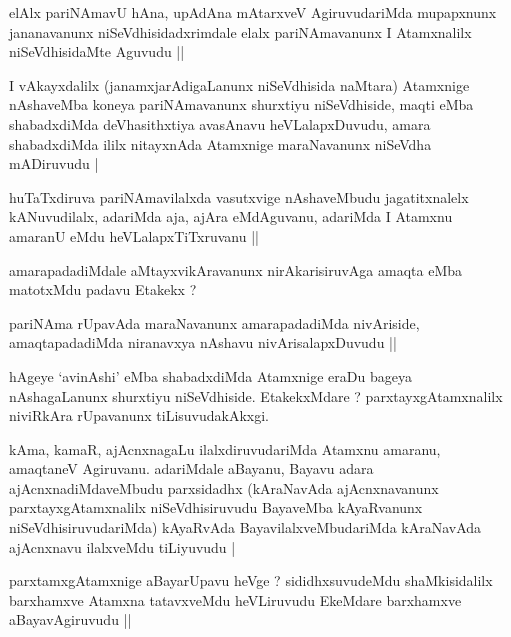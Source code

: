\begin{artha}
elAlx pariNAmavU hAna, upAdAna mAtarxveV AgiruvudariMda mupapxnunx jananavanunx niSeVdhisidadxrimdale elalx pariNAmavanunx I Atamxnalilx niSeVdhisidaMte Aguvudu ||
\end{artha}


\begin{artha}
I vAkayxdalilx (janamxjarAdigaLanunx niSeVdhisida naMtara) Atamxnige nAshaveMba koneya pariNAmavanunx shurxtiyu niSeVdhiside, maqti eMba shabadxdiMda deVhasithxtiya avasAnavu heVLalapxDuvudu, amara shabadxdiMda ililx nitayxnAda Atamxnige maraNavanunx niSeVdha mADiruvudu |
\end{artha}

\begin{artha}
huTaTxdiruva pariNAmavilalxda vasutxvige nAshaveMbudu jagatitxnalelx kANuvudilalx, adariMda aja, ajAra eMdAguvanu, adariMda I Atamxnu amaranU eMdu heVLalapxTiTxruvanu ||
\end{artha}

\begin{artha}
amarapadadiMdale aMtayxvikAravanunx nirAkarisiruvAga amaqta eMba matotxMdu padavu Etakekx ?
\end{artha}

\begin{artha}
pariNAma rUpavAda maraNavanunx amarapadadiMda nivAriside, amaqtapadadiMda niranavxya nAshavu nivArisalapxDuvudu ||
\end{artha}

\begin{artha}
hAgeye `avinAshi' eMba shabadxdiMda Atamxnige eraDu bageya nAshagaLanunx shurxtiyu niSeVdhiside. EtakekxMdare ? parxtayxgAtamxnalilx niviRkAra rUpavanunx tiLisuvudakAkxgi.
\end{artha}

\begin{artha}
kAma, kamaR, ajAcnxnagaLu ilalxdiruvudariMda Atamxnu amaranu, amaqtaneV Agiruvanu. adariMdale aBayanu, Bayavu adara ajAcnxnadiMdaveMbudu parxsidadhx (kAraNavAda ajAcnxnavanunx parxtayxgAtamxnalilx niSeVdhisiruvudu BayaveMba kAyaRvanunx niSeVdhisiruvudariMda) kAyaRvAda BayavilalxveMbudariMda kAraNavAda ajAcnxnavu ilalxveMdu tiLiyuvudu |
\end{artha}

\begin{artha}
parxtamxgAtamxnige aBayarUpavu heVge ? sididhxsuvudeMdu shaMkisidalilx barxhamxve Atamxna tatavxveMdu heVLiruvudu EkeMdare barxhamxve aBayavAgiruvudu ||
\end{artha}

